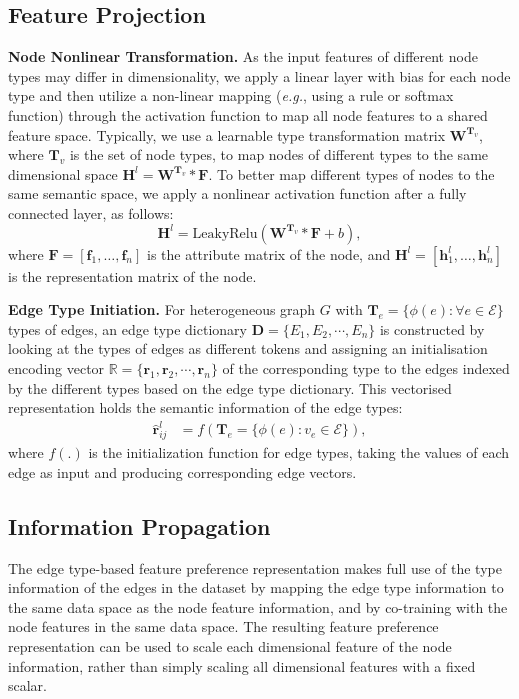 \subsection{Feature Projection} %

{\bf Node Nonlinear Transformation.} 
As the input features of different node types may differ in dimensionality, we apply a linear layer with bias for each node type and then utilize a non-linear mapping (\emph{e.g.}, using a rule or softmax function) through the activation function to map all node features to a shared feature space.
%
Typically, we use a learnable type transformation matrix $\mathbf{W}^{\mathbf{T}_{v}}$, where $\mathbf{T}_{v}$ is the set of node types, to map nodes of different types to the same dimensional space $\mathbf{H}^{l} = \mathbf{W}^{\mathbf{T}_{v}} * \mathbf{F}$.
To better map different types of nodes to the same semantic space, we apply a nonlinear activation function after a fully connected layer, as follows:
\begin{equation}
    \mathbf{H}^{l} = \text{LeakyRelu}(\mathbf{W}^{\mathbf{T}_{v}} * \mathbf{F} + b),
    \label{eq:6}
\end{equation}
where $\mathbf{F} = [ \mathbf{f}_1, \dots, \mathbf{f}_n ]$ is the attribute matrix of the node, and $\mathbf{H}^{l}=[\mathbf{h}^{l}_1, \dots, \mathbf{h}^{l}_n]$ is the representation matrix of the node.

{\bf Edge Type Initiation.} 
For heterogeneous graph $G$ with $\mathbf{T}_{e}=\{\phi(e): \forall e \in \mathcal{E}\}$ types of edges, an edge type dictionary $\mathbf{D}=\{E_1, E_2, \cdots, E_n\}$ is constructed by looking at the types of edges as different tokens and assigning an initialisation encoding vector $\mathbb{R}=\{\mathbf{r}_1,\mathbf{r}_2, \cdots ,\mathbf{r}_n\}$ of the corresponding type to the edges indexed by the different types based on the edge type dictionary. 
This vectorised representation holds the semantic information of the edge types:
\begin{align}
    \hat{\mathbf{r}}_{i j}^{l} &= f\left(\mathbf{T}_e=\{\phi(e): v_e \in \mathcal{E}\}\right),
    \label{eq:7}
\end{align}
where $f(.)$ is the initialization function for edge types, taking the values of each edge as input and producing corresponding edge vectors.

\subsection{Information Propagation} \label{sec:IP}
The edge type-based feature preference representation makes full use of the type information of the edges in the dataset by mapping the edge type information to the same data space as the node feature information, and by co-training with the node features in the same data space. 
%
The resulting feature preference representation can be used to scale each dimensional feature of the node information, rather than simply scaling all dimensional features with a fixed scalar.

